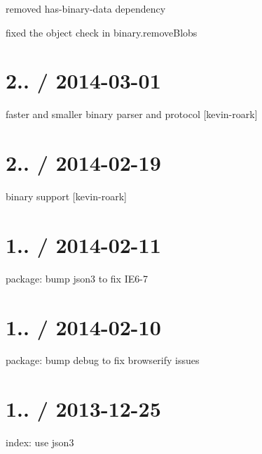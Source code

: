 \begin{DoxyItemize}
\item removed has-\/binary-\/data dependency
\item fixed the object check in binary.\+remove\+Blobs
\end{DoxyItemize}

\section*{2.. / 2014-\/03-\/01 }


\begin{DoxyItemize}
\item faster and smaller binary parser and protocol \mbox{[}kevin-\/roark\mbox{]}
\end{DoxyItemize}

\section*{2.. / 2014-\/02-\/19 }


\begin{DoxyItemize}
\item binary support \mbox{[}kevin-\/roark\mbox{]}
\end{DoxyItemize}

\section*{1.. / 2014-\/02-\/11 }


\begin{DoxyItemize}
\item package\+: bump {\ttfamily json3} to fix I\+E6-\/7
\end{DoxyItemize}

\section*{1.. / 2014-\/02-\/10 }


\begin{DoxyItemize}
\item package\+: bump debug to fix browserify issues
\end{DoxyItemize}

\section*{1.. / 2013-\/12-\/25 }


\begin{DoxyItemize}
\item index\+: use {\ttfamily json3}
\end{DoxyItemize}

